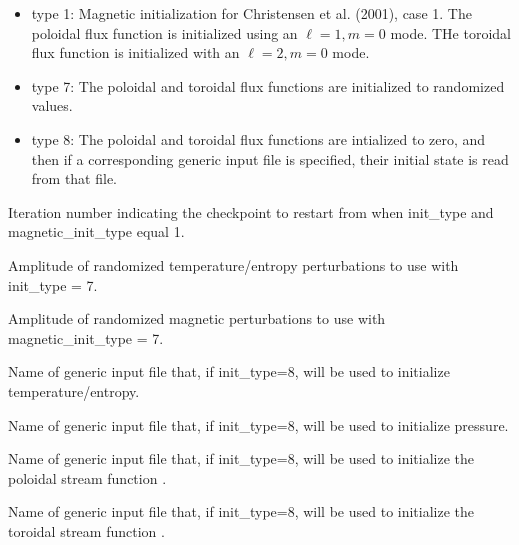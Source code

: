 \documentclass[letterpaper,11pt,english]{sphinxmanual}
\begin{document}
\begin{description}
\begin{description}
\begin{itemize}
\item {} 
\sphinxAtStartPar
type  1:  Magnetic initialization for  Christensen et al. (2001), case 1.  The poloidal flux function is initialized using an \(\ell=1,m=0\) mode.  THe toroidal flux function is initialized with an \(\ell=2,m=0\) mode.

\item {} 
\sphinxAtStartPar
type  7:  The poloidal and toroidal flux functions are initialized to randomized values.

\item {} 
\sphinxAtStartPar
type  8:  The poloidal and toroidal flux functions are intialized to zero, and then if a corresponding generic input file is specified, their initial state is read from that file.

\end{itemize}

\end{description}

\item[{\sphinxstylestrong{restart\_iter}}] \leavevmode
\sphinxAtStartPar
Iteration number indicating the checkpoint to restart from when init\_type and magnetic\_init\_type equal 1.

\item[{\sphinxstylestrong{temp\_amp}}] \leavevmode
\sphinxAtStartPar
Amplitude of randomized temperature/entropy perturbations to use with init\_type = 7.

\item[{\sphinxstylestrong{mag\_amp}}] \leavevmode
\sphinxAtStartPar
Amplitude of randomized magnetic perturbations to use with magnetic\_init\_type = 7.

\item[{\sphinxstylestrong{t\_init\_file}}] \leavevmode
\sphinxAtStartPar
Name of generic input file that, if init\_type=8, will be used to initialize temperature/entropy.

\item[{\sphinxstylestrong{p\_init\_file}}] \leavevmode
\sphinxAtStartPar
Name of generic input file that, if init\_type=8, will be used to initialize pressure.

\item[{\sphinxstylestrong{w\_init\_file}}] \leavevmode
\sphinxAtStartPar
Name of generic input file that, if init\_type=8, will be used to initialize the poloidal stream function .

\item[{\sphinxstylestrong{z\_init\_file}}] \leavevmode
\sphinxAtStartPar
Name of generic input file that, if init\_type=8, will be used to initialize the toroidal stream function .


\end{description}
\end{document}
